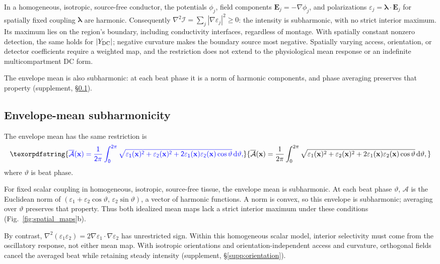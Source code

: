 \documentclass[11pt,a4paper]{article}
\newif\ifjne
\providecommand{\DIFaddtex}[1]{{\protect\color{blue} \sf #1}} %
\providecommand{\DIFdeltex}[1]{{\protect\color{red} \scriptsize #1}} %
\providecommand{\DIFaddbegin}{} %
\providecommand{\DIFaddend}{} %
\providecommand{\DIFdelbegin}{} %
\providecommand{\DIFdelend}{} %
\providecommand{\DIFadd}[1]{\texorpdfstring{\DIFaddtex{#1}}{#1}} %
\providecommand{\DIFdel}[1]{\texorpdfstring{\DIFdeltex{#1}}{}} %
\begin{document}
In a homogeneous, isotropic, source-free conductor, the potentials $\phi_j$,
field components $\mathbf E_j=-\nabla\phi_j$, and polarizations
$\varepsilon_j=\boldsymbol\lambda\cdot\mathbf E_j$ for spatially fixed
coupling $\boldsymbol\lambda$ are harmonic. Consequently
$\nabla^2\mathcal I=\sum_j|\nabla\varepsilon_j|^2\ge0$:
the intensity is subharmonic, with no strict interior maximum. Its maximum
lies on the region's boundary, including conductivity interfaces, regardless
of montage. With spatially constant nonzero detection, the same holds for
$|Y_{\rm DC}|$; negative curvature makes the boundary source most negative.
Spatially varying access, orientation, or detector coefficients require a
weighted map, and the restriction does not extend to the physiological mean
response or an indefinite multicompartment DC form.

The envelope mean is also subharmonic: at each beat phase it is a norm of
harmonic components, and phase averaging preserves that property (supplement,
\S\ref{supp:envelope-proof}).
\ifjne\else
\subsection{Envelope-mean subharmonicity}\label{supp:envelope-proof}
The envelope mean \DIFdelbegin \DIFdel{has the same restriction}\DIFdelend \DIFaddbegin \DIFadd{is
}\[
\DIFadd{\overline{\mathcal A}(\mathbf x)=\frac{1}{2\pi}\int_0^{2\pi}
\sqrt{\varepsilon_1(\mathbf x)^2+\varepsilon_2(\mathbf x)^2
+2\varepsilon_1(\mathbf x)\varepsilon_2(\mathbf x)\cos\vartheta}\,\mathrm d\vartheta,
}\]
\DIFadd{where $\vartheta$ is beat phase.
}

\DIFadd{For fixed scalar coupling in homogeneous, isotropic, source-free tissue,
the envelope mean is subharmonic}\DIFaddend . At each beat phase $\vartheta$,
$\mathcal A$ is the Euclidean norm of
$(\varepsilon_1+\varepsilon_2\cos\vartheta,\,\varepsilon_2\sin\vartheta)$,
a vector of harmonic functions. A norm is convex, so this envelope is subharmonic;
averaging over $\vartheta$ preserves that property. Thus both idealized mean maps
lack a strict interior maximum under these conditions (Fig.~\ref{fig:spatial_maps}b).

\fi
By contrast,
$\nabla^2(\varepsilon_1\varepsilon_2)=2\nabla\varepsilon_1\cdot\nabla\varepsilon_2$
has unrestricted sign. Within this homogeneous scalar model, interior
selectivity must come from the oscillatory response, not either mean map.
With isotropic orientations and orientation-independent access and curvature,
orthogonal fields cancel the averaged beat while retaining steady intensity
(supplement, \S\ref{supp:orientation}).
\ifjne\else
\end{document}
